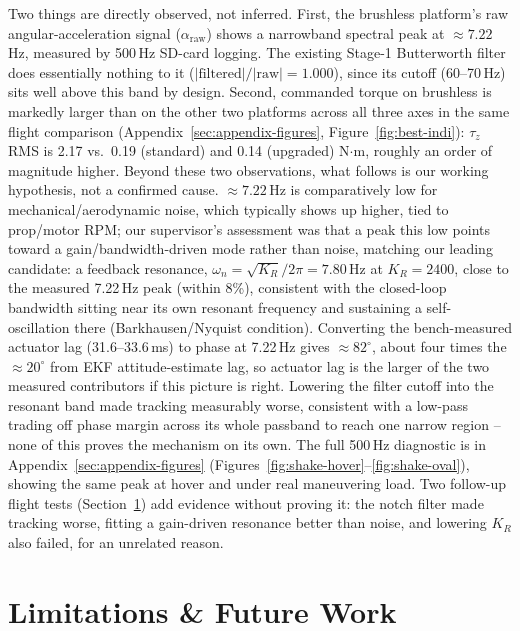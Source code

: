 \documentclass[11pt,a4paper]{article}
\begin{document}
Two things are directly observed, not inferred. First, the brushless platform's raw
angular-acceleration signal ($\alpha_{\mathrm{raw}}$) shows a narrowband spectral peak at
$\approx7.22$\,Hz, measured by 500\,Hz SD-card logging. The existing Stage-1 Butterworth filter
does essentially nothing to it ($|\mathrm{filtered}|/|\mathrm{raw}|=1.000$), since its cutoff
(60--70\,Hz) sits well above this band by design. Second, commanded torque on brushless is
markedly larger than on the other two platforms across all three axes in the same flight
comparison (Appendix~\ref{sec:appendix-figures}, Figure~\ref{fig:best-indi}): $\tau_z$ RMS is
2.17 vs.\ 0.19 (standard) and 0.14 (upgraded) N$\cdot$m, roughly an order of magnitude higher.
Beyond these two observations, what follows is our working hypothesis, not a confirmed cause.
$\approx7.22$\,Hz is comparatively low for mechanical/aerodynamic noise, which typically shows up
higher, tied to prop/motor RPM; our supervisor's assessment was that a peak this low points toward
a gain/bandwidth-driven mode rather than noise, matching our leading candidate: a feedback
resonance, $\omega_n=\sqrt{K_R}/2\pi = 7.80$\,Hz at $K_R=2400$, close to the measured 7.22\,Hz
peak (within 8\%), consistent with the closed-loop bandwidth sitting near its own resonant
frequency and sustaining a self-oscillation there (Barkhausen/Nyquist
condition). Converting the bench-measured actuator lag (31.6--33.6\,ms) to phase at 7.22\,Hz gives
$\approx82^\circ$, about four times the $\approx20^\circ$ from EKF attitude-estimate lag, so
actuator lag is the larger of the two measured contributors if this picture is right. Lowering the
filter cutoff into the resonant band made tracking measurably worse, consistent with a low-pass
trading off phase margin across its whole passband to reach one narrow region -- none of this
proves the mechanism on its own. The full 500\,Hz diagnostic is in
Appendix~\ref{sec:appendix-figures} (Figures~\ref{fig:shake-hover}--\ref{fig:shake-oval}), showing
the same peak at hover and under real maneuvering load. Two follow-up flight tests
(Section~\ref{sec:limitations}) add evidence without proving it: the notch filter made tracking
worse, fitting a gain-driven resonance better than noise, and lowering $K_R$ also failed, for an
unrelated reason.

\section{Limitations \& Future Work}
\label{sec:limitations}
\end{document}
